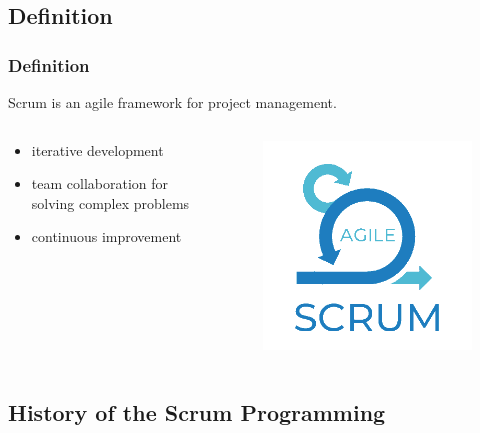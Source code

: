 \documentclass[
	11pt, %
]{beamer}
\begin{document}

\subsection{Definition}
\begin{frame}
	\frametitle{Definition}
	Scrum is an agile framework for project management.

	\begin{columns}[c] %
		\begin{column}{0.45\textwidth} %
			\begin{itemize} %
				\item iterative development
				\item team collaboration for solving complex problems
				\item continuous improvement
			\end{itemize}
		\end{column}
		\begin{column}{0.5\textwidth} %
			\begin{figure}
				\includegraphics[width=0.7\linewidth]{scrum-logo.png}
			\end{figure}
		\end{column}
	\end{columns}

\end{frame}

\subsection{History of the Scrum Programming}
\end{document}
